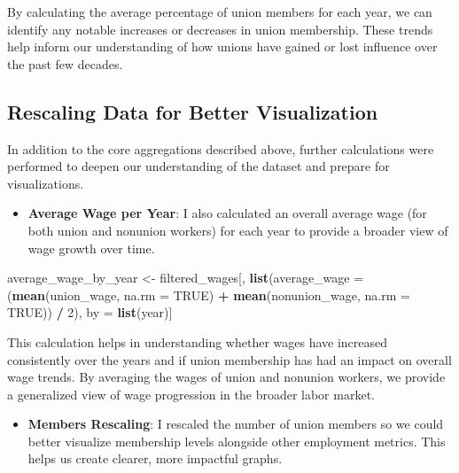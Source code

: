 \documentclass[
]{book}
\newenvironment{Shaded}{\begin{snugshade}}{\end{snugshade}}
\newcommand{\AttributeTok}[1]{\textcolor[rgb]{0.13,0.29,0.53}{#1}}
\newcommand{\ConstantTok}[1]{\textcolor[rgb]{0.56,0.35,0.01}{#1}}
\newcommand{\DecValTok}[1]{\textcolor[rgb]{0.00,0.00,0.81}{#1}}
\newcommand{\FunctionTok}[1]{\textcolor[rgb]{0.13,0.29,0.53}{\textbf{#1}}}
\newcommand{\NormalTok}[1]{#1}
\newcommand{\OtherTok}[1]{\textcolor[rgb]{0.56,0.35,0.01}{#1}}
\newcommand{\SpecialCharTok}[1]{\textcolor[rgb]{0.81,0.36,0.00}{\textbf{#1}}}
\providecommand{\tightlist}{%
  \setlength{\itemsep}{0pt}\setlength{\parskip}{0pt}}
\theoremstyle{definition}
\theoremstyle{definition}
\theoremstyle{definition}
\theoremstyle{definition}
\theoremstyle{remark}
\begin{document}
By calculating the average percentage of union members for each year, we can identify any notable increases or decreases in union membership. These trends help inform our understanding of how unions have gained or lost influence over the past few decades.

\subsection{Rescaling Data for Better Visualization}\label{rescaling-data-for-better-visualization}

In addition to the core aggregations described above, further calculations were performed to deepen our understanding of the dataset and prepare for visualizations.

\begin{itemize}
\tightlist
\item
  \textbf{Average Wage per Year}: I also calculated an overall average wage (for both union and nonunion workers) for each year to provide a broader view of wage growth over time.
\end{itemize}

\begin{Shaded}
\begin{Highlighting}[]
\NormalTok{average\_wage\_by\_year }\OtherTok{\textless{}{-}}\NormalTok{ filtered\_wages[,}
      \FunctionTok{list}\NormalTok{(}\AttributeTok{average\_wage =}\NormalTok{ (}\FunctionTok{mean}\NormalTok{(union\_wage, }\AttributeTok{na.rm =} \ConstantTok{TRUE}\NormalTok{) }\SpecialCharTok{+} 
      \FunctionTok{mean}\NormalTok{(nonunion\_wage, }\AttributeTok{na.rm =} \ConstantTok{TRUE}\NormalTok{)) }\SpecialCharTok{/} \DecValTok{2}\NormalTok{), }
\NormalTok{        by }\OtherTok{=} \FunctionTok{list}\NormalTok{(year)]}
\end{Highlighting}
\end{Shaded}

This calculation helps in understanding whether wages have increased consistently over the years and if union membership has had an impact on overall wage trends. By averaging the wages of union and nonunion workers, we provide a generalized view of wage progression in the broader labor market.

\begin{itemize}
\tightlist
\item
  \textbf{Members Rescaling}: I rescaled the number of union members so we could better visualize membership levels alongside other employment metrics. This helps us create clearer, more impactful graphs.
\end{itemize}
\end{document}
